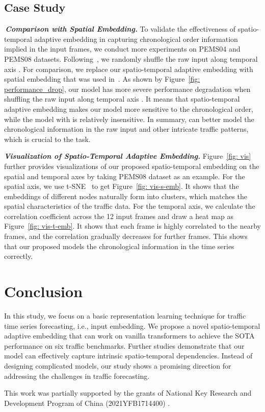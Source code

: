 \documentclass[sigconf]{acmart}
\begin{document}
\subsection{Case Study}
\quad\,\textit{\textbf{Comparison with Spatial Embedding.}} To validate the effectiveness of spatio-temporal adaptive embedding in capturing chronological order information implied in the  input frames, we conduct more experiments on PEMS04 and PEMS08 datasets. Following~\cite{AreTrans}, we randomly shuffle the raw input along temporal axis . For comparison, we replace our spatio-temporal adaptive embedding  with spatial embedding  that was used in~\cite{STID,PDFormer}. As shown by Figure~\ref{fig: performance_drop}, our model has more severe performance degradation when shuffling the raw input along temporal axis . It means that spatio-temporal adaptive embedding  makes our model more sensitive to the chronological order, while the model with  is relatively insensitive. In summary,  can better model the chronological information in the raw input and other intricate traffic patterns, which is crucial to the task.




\textit{\textbf{Visualization of Spatio-Temporal Adaptive Embedding.}} Figure~\ref{fig: vis} further provides visualizations of our proposed spatio-temporal embedding  on the spatial and temporal axes by taking PEMS08 dataset as an example. For the spatial axis, we use t-SNE~\cite{TSNE} to get Figure~\ref{fig: vis-s-emb}. It shows that the embeddings of different nodes naturally form into clusters, which matches the spatial characteristics of the traffic data. For the temporal axis, we calculate the correlation coefficient across the 12 input frames and draw a heat map as Figure~\ref{fig: vis-t-emb}. It shows that each frame is highly correlated to the nearby frames, and the correlation gradually decreases for further frames. This shows that our proposed  models the chronological information in the time series correctly.





\section{Conclusion}


In this study, we focus on a basic representation learning technique for traffic time series forecasting, i.e., input embedding. We propose a novel spatio-temporal adaptive embedding that can work on vanilla transformers to achieve the SOTA performance on six traffic benchmarks. Further studies demonstrate that our model can effectively capture intrinsic spatio-temporal dependencies. Instead of designing complicated models, our study shows a promising direction for addressing the challenges in traffic forecasting.



\begin{acks}
This work was partially supported by the grants of National Key Research and Development Program of China (2021YFB1714400) .
\end{acks}



\end{document}
